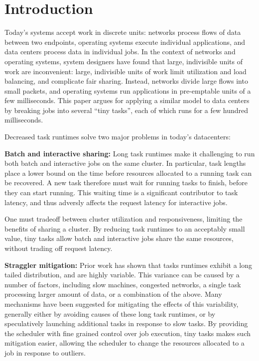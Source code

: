 \section{Introduction}
Today's systems accept work in discrete units: networks process flows of data
between two endpoints, operating systems execute individual applications, and
data centers process data in individual jobs.  In the context of networks and
operating systems, system designers have found that large, indivisible units of work are
inconvenient: large, indivisible units of work limit utilization and load balancing,
and complicate fair sharing.  Instead, networks divide large flows into small
packets, and operating systems run applications in pre-emptable units of a 
few milliseconds.  This paper argues for
applying a similar model to data centers by breaking jobs into
several ``tiny tasks'', each of which runs for a few hundred milliseconds.

Decreased task runtimes solve two major problems in today's datacenters:

\vspace{4pt}\noindent\textbf{Batch and interactive sharing:}
Long task runtimes make it challenging to run both batch and interactive
jobs on the same cluster. In particular, task lengths place a lower bound on
the time before resources allocated to a running task can be recovered. A new
task therefore must wait for running tasks to finish, before they can start running.
This waiting time is a significant contributor to task latency, and thus adversly
affects the request latency for interactive jobs.

One must tradeoff between
cluster utilization and responsiveness, limiting the benefits of sharing
a cluster. By reducing task runtimes to an acceptably small value, tiny
tasks allow batch and interactive jobs share the same resources, without
trading off request latency.

\vspace{4pt}\noindent\textbf{Straggler mitigation:}
Prior work has shown that tasks runtimes exhibit a long
tailed distribution, and are highly variable. This variance can be caused by
a number of factors, including slow machines, congested networks, a single task
processing larger amount of data, or a combination of the above.
Many mechanisms have been suggested for mitigating
the effects of this variability, generally either by avoiding causes of these
long task runtimes, or by speculatively launching additional tasks in response to slow tasks.
By providing the scheduler with fine grained control over job execution, tiny
tasks makes such mitigation easier, allowing the scheduler to change the resources
allocated to a job in response to outliers.\\


